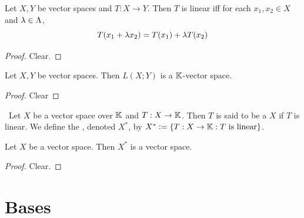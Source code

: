 \documentclass{book}
\begin{document}
 \begin{ex}
 	Let $X,Y$ be vector spaces and $T : X \rightarrow Y$. Then $T$ is linear iff for each $x_1, x_2 \in X$ and $\lambda \in \Lambda$, 
 	$$T(x_1 + \lambda x_2) = T(x_1) + \lambda T(x_2)$$
 \end{ex}
 
 \begin{proof}
 	Clear. 
 \end{proof}
 
 \begin{defn}
 \end{defn}
 
 \begin{ex}
 	Let $X,Y$ be vector spaces. Then $L(X;Y)$ is a $\mathbb{K}$-vector space. 
 \end{ex}
 
 \begin{proof}
 	Clear
 \end{proof}
 
 \begin{defn} \
 	Let $X$ be a vector space over $\mathbb{K}$ and $T :X \rightarrow \mathbb{K}$. Then $T$ is said to be a  $X$ if $T$ is linear. We define the , denoted $X^*$, by $X^* \vcentcolon= \{ T:X \rightarrow \mathbb{K}: T \text{ is linear}\}$. 
 \end{defn}
 
 
 \begin{ex}
 	Let $X$ be a vector space. Then $X^*$ is a vector space. 
 \end{ex}
 
 \begin{proof}
 	Clear.
 \end{proof}
 
 
 
 
 
 
 
 
 
 
 
 
 
 
 
 
 
 
 
 
 
 
 
 
 
 
 
 
 
 
 
 \section{Bases}
 
\end{document}

